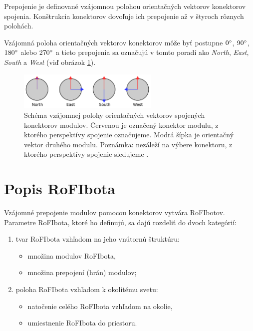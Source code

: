 \documentclass[
  digital, %
  oneside, %
  table,   %
  lof,     %
  nolot,     %
]{fithesis3}
\begin{document}
Prepojenie je definované vzájomnou polohou orientačných vektorov konektorov spojenia. Konštrukcia konektorov dovoľuje ich prepojenie až v štyroch rôznych polohách. 

Vzájomná poloha orientačných vektorov konektorov môže byť postupne $0\degree$, $90\degree$, $180\degree$ alebo $270\degree$ a tieto prepojenia sa označujú v tomto poradí ako \textit{North}, \textit{East}, \textit{South} a \textit{West} (viď obrázok \ref{fig:dock_orientation}). 

\begin{figure}[hbt!]
    \centering
    \includegraphics[width=0.6\textwidth]{pictures/dock_orientation.pdf}
    \caption[Poloha prepojenia konektorov modulu]{Schéma vzájomnej polohy orientačných vektorov spojených konektorov modulov. Červenou je označený konektor modulu, z ktorého perspektívy spojenie označujeme. Modrá šípka je orientačný vektor druhého modulu. Poznámka: nezáleží na výbere konektoru, z ktorého perspektívy spojenie sledujeme \cite{mrazekMasterThesis}.}
    \label{fig:dock_orientation}
\end{figure}

\section{Popis RoFIbota}
\label{sec:rofibotSpec}
Vzájomné prepojenie modulov pomocou konektorov vytvára RoFIbotov. Parametre RoFIbota, ktoré ho definujú, sa dajú rozdeliť do dvoch kategórií:   
\begin{enumerate}
    \item tvar RoFIbota vzhľadom na jeho vnútornú štruktúru:
    \begin{itemize}[topsep=-5pt]
        \item množina modulov RoFIbota, 
        \item množina prepojení (hrán) modulov; 
    \end{itemize}
    
    \item poloha RoFIbota vzhľadom k okolitému svetu: 
    \begin{itemize}[topsep=-5pt]
        \item natočenie celého RoFIbota vzhľadom na okolie, 
        \item umiestnenie RoFIbota do priestoru.  
    \end{itemize}
\end{enumerate}
\end{document}
